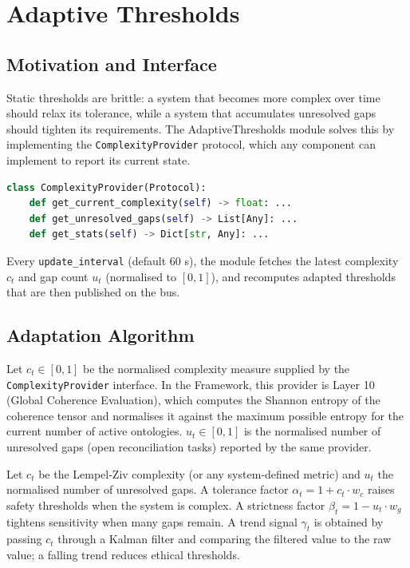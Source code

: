 \section{Adaptive Thresholds}

\subsection{Motivation and Interface}

Static thresholds are brittle: a system that becomes more complex over time
should relax its tolerance, while a system that accumulates unresolved gaps
should tighten its requirements.  The AdaptiveThresholds module solves this
by implementing the \texttt{ComplexityProvider} protocol, which any component
can implement to report its current state.

\begin{lstlisting}[language=Python, caption={ComplexityProvider protocol}]
class ComplexityProvider(Protocol):
    def get_current_complexity(self) -> float: ...
    def get_unresolved_gaps(self) -> List[Any]: ...
    def get_stats(self) -> Dict[str, Any]: ...
\end{lstlisting}

Every \texttt{update\_interval} (default 60 s), the module fetches the latest
complexity $c_t$ and gap count $u_t$ (normalised to $[0,1]$), and recomputes
adapted thresholds that are then published on the bus.

\subsection{Adaptation Algorithm}

Let $c_t \in [0,1]$ be the normalised complexity measure supplied by
the \texttt{ComplexityProvider} interface.  In the \Apeiron{} Framework,
this provider is Layer 10 (Global Coherence Evaluation), which computes
the Shannon entropy of the coherence tensor and normalises it against
the maximum possible entropy for the current number of active ontologies.
$u_t \in [0,1]$ is the normalised number of unresolved gaps (open
reconciliation tasks) reported by the same provider.

Let $c_t$ be the Lempel‑Ziv complexity (or any system‑defined metric) and
$u_t$ the normalised number of unresolved gaps.  A tolerance factor 
$\alpha_t = 1 + c_t \cdot w_c$ raises safety thresholds when the system is
complex.  A strictness factor $\beta_t = 1 - u_t \cdot w_g$ tightens
sensitivity when many gaps remain.  A trend signal $\gamma_t$ is obtained by
passing $c_t$ through a Kalman filter and comparing the filtered value to the
raw value; a falling trend reduces ethical thresholds.

